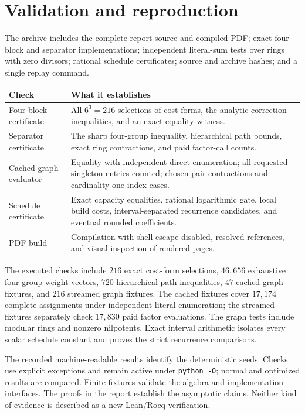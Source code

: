 \documentclass[11pt,letterpaper]{article}
\theoremstyle{remark}\newtheorem{remark}[theorem]{Remark}
\begin{document}
\section{Validation and reproduction}
\label{sec:validation}

The archive includes the complete report source and compiled PDF; exact
four-block and separator implementations; independent literal-sum tests
over rings with zero divisors; rational schedule certificates; source and
archive hashes; and a single replay command.

\begin{center}
\begin{tabular}{@{}p{}p{}@{}}
\toprule Check & What it establishes\\\midrule
Four-block certificate & All $6^3=216$ selections of cost forms, the
analytic correction inequalities, and an exact equality witness.\\
Separator certificate & The sharp four-group inequality, hierarchical
path bounds, exact ring contractions, and paid factor-call counts.\\
Cached graph evaluator & Equality with independent direct enumeration;
all requested singleton entries counted; chosen pair contractions and
cardinality-one index cases.\\
Schedule certificate & Exact capacity equalities, rational logarithmic
gate, local build costs, interval-separated recurrence candidates,
and eventual rounded coefficients.\\
PDF build & Compilation with shell escape disabled, resolved references,
and visual inspection of rendered pages.\\
\bottomrule
\end{tabular}
\end{center}

The executed checks include $216$ exact cost-form selections, $46{,}656$
exhaustive four-group weight vectors, $720$ hierarchical path inequalities,
$47$ cached graph fixtures, and $216$ streamed graph fixtures. The cached
fixtures cover $17{,}174$ complete assignments under independent literal
enumeration; the streamed fixtures separately check $17{,}830$ paid factor
evaluations. The graph tests include modular rings and nonzero nilpotents.
Exact interval arithmetic isolates every scalar schedule constant and
proves the strict recurrence comparisons.

The recorded machine-readable results identify the deterministic seeds.
Checks use explicit exceptions and remain
active under \texttt{python -O}; normal and optimized results are compared.
Finite fixtures validate the algebra and implementation interfaces. The
proofs in the report establish the asymptotic claims. Neither kind of
evidence is described as a new Lean/Rocq verification.
\end{document}

